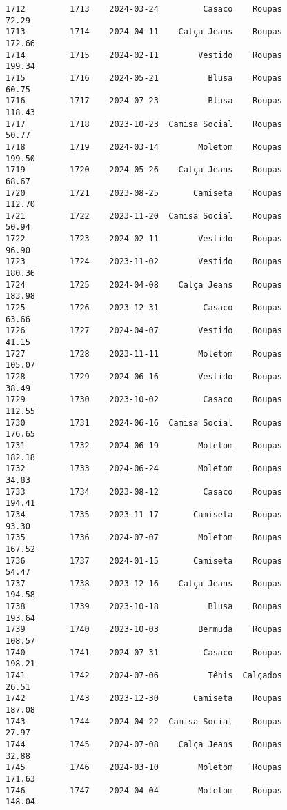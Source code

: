 \documentclass[11pt]{article}
\begin{document}
\begin{Verbatim}[commandchars=\\\{\}]
1712         1713    2024-03-24         Casaco    Roupas           72.29   
1713         1714    2024-04-11    Calça Jeans    Roupas          172.66   
1714         1715    2024-02-11        Vestido    Roupas          199.34   
1715         1716    2024-05-21          Blusa    Roupas           60.75   
1716         1717    2024-07-23          Blusa    Roupas          118.43   
1717         1718    2023-10-23  Camisa Social    Roupas           50.77   
1718         1719    2024-03-14        Moletom    Roupas          199.50   
1719         1720    2024-05-26    Calça Jeans    Roupas           68.67   
1720         1721    2023-08-25       Camiseta    Roupas          112.70   
1721         1722    2023-11-20  Camisa Social    Roupas           50.94   
1722         1723    2024-02-11        Vestido    Roupas           96.90   
1723         1724    2023-11-02        Vestido    Roupas          180.36   
1724         1725    2024-04-08    Calça Jeans    Roupas          183.98   
1725         1726    2023-12-31         Casaco    Roupas           63.66   
1726         1727    2024-04-07        Vestido    Roupas           41.15   
1727         1728    2023-11-11        Moletom    Roupas          105.07   
1728         1729    2024-06-16        Vestido    Roupas           38.49   
1729         1730    2023-10-02         Casaco    Roupas          112.55   
1730         1731    2024-06-16  Camisa Social    Roupas          176.65   
1731         1732    2024-06-19        Moletom    Roupas          182.18   
1732         1733    2024-06-24        Moletom    Roupas           34.83   
1733         1734    2023-08-12         Casaco    Roupas          194.41   
1734         1735    2023-11-17       Camiseta    Roupas           93.30   
1735         1736    2024-07-07        Moletom    Roupas          167.52   
1736         1737    2024-01-15       Camiseta    Roupas           54.47   
1737         1738    2023-12-16    Calça Jeans    Roupas          194.58   
1738         1739    2023-10-18          Blusa    Roupas          193.64   
1739         1740    2023-10-03        Bermuda    Roupas          108.57   
1740         1741    2024-07-31         Casaco    Roupas          198.21   
1741         1742    2024-07-06          Tênis  Calçados           26.51   
1742         1743    2023-12-30       Camiseta    Roupas          187.08   
1743         1744    2024-04-22  Camisa Social    Roupas           27.97   
1744         1745    2024-07-08    Calça Jeans    Roupas           32.88   
1745         1746    2024-03-10        Moletom    Roupas          171.63   
1746         1747    2024-04-04        Moletom    Roupas          148.04   

\end{Verbatim}
\end{document}

